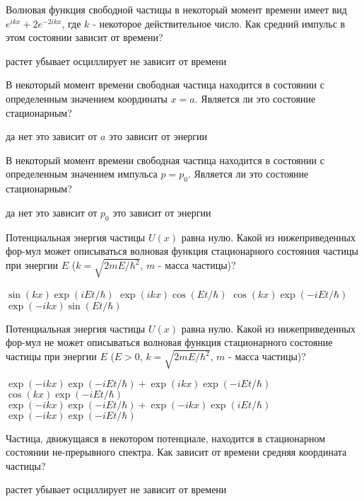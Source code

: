 \documentclass[11pt,a4paper]{exam}
\begin{document}
\begin{questions}
\question Волновая функция свободной частицы в некоторый момент времени имеет вид ${e^{ikx}} + 2{e^{ - 2ikx}}$, где $k$ - некоторое действительное число. Как средний импульс в этом состоянии зависит от времени?
\begin{choices}
\choice растет      
\choice убывает     
\choice осциллирует    
\choice не зависит от времени
\end{choices}

\question В некоторый момент времени свободная частица находится в состоянии с определенным значением координаты $x = a$. Является ли это состояние стационарным?
\begin{choices}
\choice да       
\choice нет         
\choice это зависит от $a$      
\choice это зависит от энергии
\end{choices}

\question В некоторый момент времени свободная частица находится в состоянии с определенным значением импульса $p = {p_0}$. Является ли это состояние стационарным?
\begin{choices}
\choice да       
\choice нет         
\choice это зависит от ${p_0}$     
\choice это зависит от энергии
\end{choices}

\question Потенциальная энергия частицы $U(x)$ равна нулю. Какой из нижеприведенных фор-мул может описываться волновая функция стационарного состояния частицы при энергии $E$ ($k = \sqrt {2mE/{\hbar ^2}} $, $m$ - масса частицы)?
\begin{choices}
\choice $\sin (kx)\exp (iEt/\hbar )$           
\choice $\exp (ikx)\cos (Et/\hbar )$
\choice $\cos (kx)\exp ( - iEt/\hbar )$        
\choice $\exp ( - ikx)\sin (Et/\hbar )$
\end{choices}

\question Потенциальная энергия частицы $U(x)$ равна нулю. Какой из нижеприведенных фор-мул не может описываться волновая функция стационарного состояние частицы при энергии $E$ ($E > 0$, $k = \sqrt {2mE/{\hbar ^2}} $, $m$ - масса частицы)?
\begin{choices}
\choice $\exp ( - ikx)\exp ( - iEt/\hbar ) + \exp (ikx)\exp ( - iEt/\hbar )$    
\choice $\cos (kx)\exp ( - iEt/\hbar )$
\choice $\exp ( - ikx)\exp ( - iEt/\hbar ) + \exp ( - ikx)\exp (iEt/\hbar )$     
\choice $\exp ( - ikx)\exp ( - iEt/\hbar )$
\end{choices}

\question Частица, движущаяся в некотором потенциале, находится в стационарном состоянии не-прерывного спектра. Как зависит от времени средняя координата частицы?
\begin{choices}
\choice растет      
\choice убывает     
\choice осциллирует    
\choice не зависит от времени
\end{choices}


\end{questions}
\end{document}
